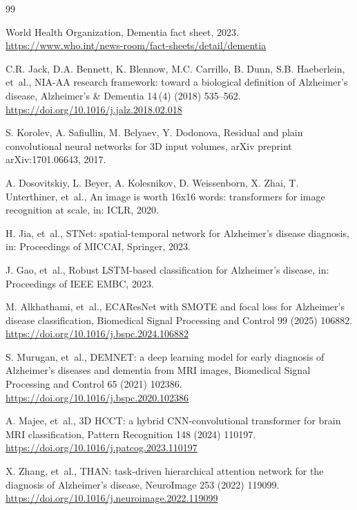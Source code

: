 \documentclass[12pt,a4paper]{article}
\begin{document}
\begin{thebibliography}{99}

World Health Organization, Dementia fact sheet, 2023.
\url{https://www.who.int/news-room/fact-sheets/detail/dementia}

C.R. Jack, D.A. Bennett, K. Blennow, M.C. Carrillo, B. Dunn, S.B. Haeberlein, et~al., NIA-AA research framework: toward a biological definition of Alzheimer's disease, Alzheimer's \& Dementia 14\,(4) (2018) 535--562.
\url{https://doi.org/10.1016/j.jalz.2018.02.018}

S. Korolev, A. Safiullin, M. Belyaev, Y. Dodonova, Residual and plain convolutional neural networks for 3D input volumes, arXiv preprint arXiv:1701.06643, 2017.

A. Dosovitskiy, L. Beyer, A. Kolesnikov, D. Weissenborn, X. Zhai, T. Unterthiner, et~al., An image is worth 16x16 words: transformers for image recognition at scale, in: ICLR, 2020.

H. Jia, et~al., STNet: spatial-temporal network for Alzheimer's disease diagnosis, in: Proceedings of MICCAI, Springer, 2023.

J. Gao, et~al., Robust LSTM-based classification for Alzheimer's disease, in: Proceedings of IEEE EMBC, 2023.

M. Alkhathami, et~al., ECAResNet with SMOTE and focal loss for Alzheimer's disease classification, Biomedical Signal Processing and Control 99 (2025) 106882.
\url{https://doi.org/10.1016/j.bspc.2024.106882}

S. Murugan, et~al., DEMNET: a deep learning model for early diagnosis of Alzheimer's diseases and dementia from MRI images, Biomedical Signal Processing and Control 65 (2021) 102386.
\url{https://doi.org/10.1016/j.bspc.2020.102386}

A. Majee, et~al., 3D HCCT: a hybrid CNN-convolutional transformer for brain MRI classification, Pattern Recognition 148 (2024) 110197.
\url{https://doi.org/10.1016/j.patcog.2023.110197}

X. Zhang, et~al., THAN: task-driven hierarchical attention network for the diagnosis of Alzheimer's disease, NeuroImage 253 (2022) 119099.
\url{https://doi.org/10.1016/j.neuroimage.2022.119099}


\end{thebibliography}
\end{document}
